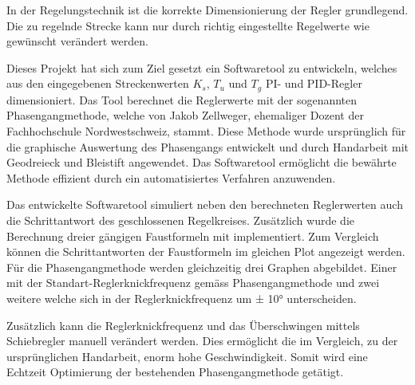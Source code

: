 
In der Regelungstechnik ist die korrekte Dimensionierung der Regler grundlegend. Die zu regelnde Strecke kann nur durch richtig eingestellte Regelwerte wie gewünscht verändert werden. 

Dieses Projekt hat sich zum Ziel gesetzt ein Softwaretool zu entwickeln, welches aus den eingegebenen Streckenwerten $K_s$, $T_u$ und $T_g$ PI- und PID-Regler dimensioniert. Das Tool berechnet die Reglerwerte mit der sogenannten Phasengangmethode, welche von Jakob Zellweger, ehemaliger Dozent der Fachhochschule Nordwestschweiz, stammt. Diese Methode wurde ursprünglich für die graphische Auswertung des Phasengangs entwickelt und durch Handarbeit mit Geodreieck und Bleistift angewendet. Das Softwaretool ermöglicht die bewährte Methode effizient durch ein automatisiertes Verfahren anzuwenden.

Das entwickelte Softwaretool simuliert neben den berechneten Reglerwerten auch die Schrittantwort des geschlossenen Regelkreises. Zusätzlich wurde die Berechnung dreier gängigen Faustformeln mit implementiert. Zum Vergleich können die Schrittantworten der Faustformeln im gleichen Plot angezeigt werden.
Für die Phasengangmethode werden gleichzeitig drei Graphen abgebildet. Einer mit der Standart-Reglerknickfrequenz gemäss Phasengangmethode und zwei weitere welche sich in der Reglerknickfrequenz um ± 10° unterscheiden.

Zusätzlich kann die Reglerknickfrequenz und das Überschwingen mittels Schiebregler manuell verändert werden. Dies ermöglicht die im Vergleich, zu der ursprünglichen Handarbeit, enorm hohe Geschwindigkeit. Somit wird eine Echtzeit Optimierung der bestehenden Phasengangmethode getätigt.



